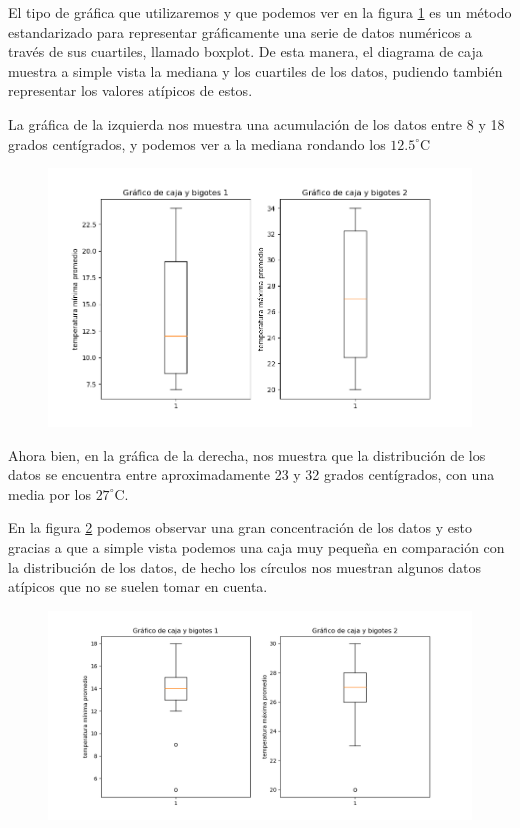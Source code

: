 \documentclass[12pt,a4paper]{article}
\begin{document}
\noindent El tipo de gráfica que utilizaremos y que podemos ver en la figura \ref{Fig:cajas1} es un método estandarizado para representar gráficamente una serie de datos numéricos a través de sus cuartiles, llamado boxplot. De esta manera, el diagrama de caja muestra a simple vista la mediana y los cuartiles de los datos, pudiendo también representar los valores atípicos de estos. 

\noindent La gráfica de la izquierda nos muestra una acumulación de los datos entre 8 y 18 grados centígrados, y podemos ver a la mediana rondando los  $12.5 ^{\circ} $C

\begin{figure}[H]
\centering
\includegraphics[scale=0.45]{Temp_pro_mensual_cajas.png} 
\caption{}
\label{Fig:cajas1}
\end{figure}

Ahora bien, en la gráfica de la derecha, nos muestra que la distribución de los datos se encuentra entre aproximadamente 23 y 32 grados centígrados, con una media por los $27 ^{\circ}$C.

\noindent En la figura \ref{Fig:cajas2} podemos observar una gran concentración de los datos y esto gracias a que a simple vista podemos una caja muy pequeña en comparación con la distribución de los datos, de hecho los círculos nos muestran algunos datos atípicos que no se suelen tomar en cuenta.



\begin{figure}[H]
\centering
\includegraphics[scale=0.45]{Cajas_bigotes_temp_anual.png} 
\caption{}
\label{Fig:cajas2}
\end{figure}
\end{document}
